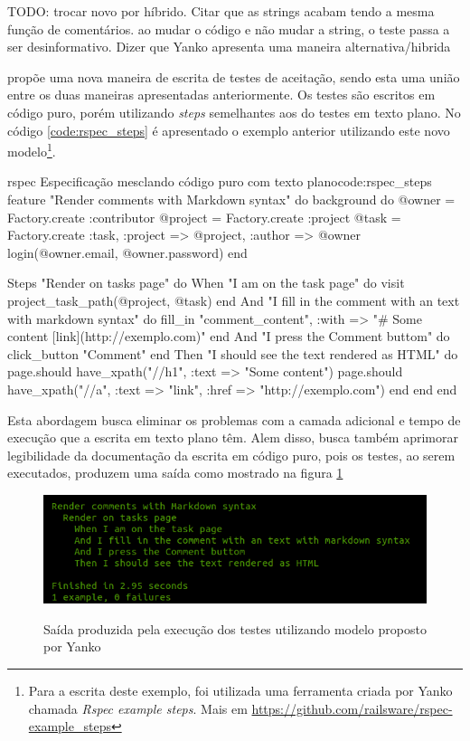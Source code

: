 TODO: trocar novo por híbrido. Citar que as strings acabam tendo a mesma função de comentários. ao mudar o código e não mudar a string, o teste passa a ser desinformativo. Dizer que Yanko apresenta uma maneira alternativa/hibrida

 propõe uma nova maneira de escrita de testes de aceitação, sendo esta uma união entre os duas maneiras apresentadas anteriormente. Os testes são escritos em código puro, porém utilizando \textit{steps} semelhantes aos do testes em texto plano. No código \ref{code:rspec_steps} é apresentado o exemplo anterior utilizando este novo modelo\footnote{Para a escrita deste exemplo, foi utilizada uma ferramenta criada por Yanko chamada \textit{Rspec example steps}. Mais em \url{https://github.com/railsware/rspec-example_steps}}.

\begin{mycode}{rspec}%
{Especificação mesclando código puro com texto plano}{code:rspec_steps}
feature "Render comments with Markdown syntax" do
  background do
    @owner = Factory.create :contributor
    @project = Factory.create :project
    @task = Factory.create :task, :project => @project, :author => @owner
    login(@owner.email, @owner.password)
  end

  Steps "Render on tasks page" do
    When "I am on the task page" do
      visit project_task_path(@project, @task)
    end
    And "I fill in the comment with an text with markdown syntax" do
      fill_in "comment_content", :with => "# Some content [link](http://exemplo.com)"
    end
    And "I press the Comment buttom" do
      click_button "Comment"
    end
    Then "I should see the text rendered as HTML" do
      page.should have_xpath("//h1", :text => "Some content")
      page.should have_xpath("//a", :text => "link", :href => "http://exemplo.com")
    end
  end
end
\end{mycode}

Esta abordagem busca eliminar os problemas com a camada adicional e tempo de execução que a escrita em texto plano têm. Alem disso, busca também aprimorar legibilidade da documentação da escrita em código puro, pois os testes, ao serem executados, produzem uma saída como mostrado na figura \ref{img:output-novo-modelo}

\begin{figure}[h]
  \center
  \caption{Saída produzida pela execução dos testes utilizando modelo proposto por Yanko}
  \includegraphics[scale=0.6]{images/output-novo-modelo}
  \label{img:output-novo-modelo}
\end{figure}

